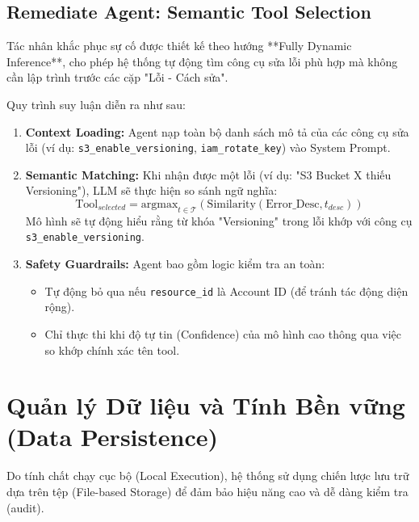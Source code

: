 \subsection{Remediate Agent: Semantic Tool Selection}
Tác nhân khắc phục sự cố được thiết kế theo hướng **Fully Dynamic Inference**, cho phép hệ thống tự động tìm công cụ sửa lỗi phù hợp mà không cần lập trình trước các cặp "Lỗi - Cách sửa".

Quy trình suy luận diễn ra như sau:
\begin{enumerate}
    \item \textbf{Context Loading:} Agent nạp toàn bộ danh sách mô tả của các công cụ sửa lỗi (ví dụ: \texttt{s3\_enable\_versioning}, \texttt{iam\_rotate\_key}) vào System Prompt.
    \item \textbf{Semantic Matching:} Khi nhận được một lỗi (ví dụ: "S3 Bucket X thiếu Versioning"), LLM sẽ thực hiện so sánh ngữ nghĩa:
    \begin{equation}
        \text{Tool}_{selected} = \text{argmax}_{t \in \mathcal{T}} (\text{Similarity}(\text{Error\_Desc}, t_{desc}))
    \end{equation}
    Mô hình sẽ tự động hiểu rằng từ khóa "Versioning" trong lỗi khớp với công cụ \texttt{s3\_enable\_versioning}.
    \item \textbf{Safety Guardrails:} Agent bao gồm logic kiểm tra an toàn:
    \begin{itemize}
        \item Tự động bỏ qua nếu \texttt{resource\_id} là Account ID (để tránh tác động diện rộng).
        \item Chỉ thực thi khi độ tự tin (Confidence) của mô hình cao thông qua việc so khớp chính xác tên tool.
    \end{itemize}
\end{enumerate}

\section{Quản lý Dữ liệu và Tính Bền vững (Data Persistence)}

Do tính chất chạy cục bộ (Local Execution), hệ thống sử dụng chiến lược lưu trữ dựa trên tệp (File-based Storage) để đảm bảo hiệu năng cao và dễ dàng kiểm tra (audit).

